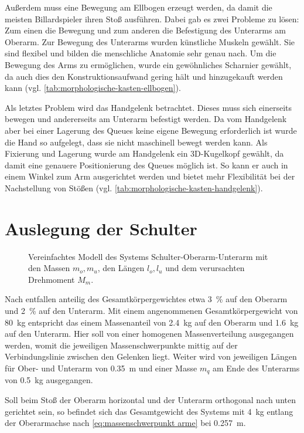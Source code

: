 		Außerdem muss eine Bewegung am Ellbogen erzeugt werden, da damit die meisten Billardspieler ihren Stoß ausführen. Dabei gab es zwei Probleme zu lösen: Zum einen die Bewegung und zum anderen die Befestigung des Unterarms am Oberarm. Zur Bewegung des Unterarms wurden künstliche Muskeln gewählt. Sie sind flexibel und bilden die menschliche Anatomie sehr genau nach. Um die Bewegung des Arms zu ermöglichen, wurde ein gewöhnliches Scharnier gewählt, da auch dies den Konstruktionsaufwand gering hält und hinzugekauft werden kann (vgl. \cref{tab:morphologische-kasten-ellbogen}).\par\medskip

		Als letztes Problem wird das Handgelenk betrachtet. Dieses muss sich einerseits bewegen und andererseits am Unterarm befestigt werden. Da vom Handgelenk aber bei einer Lagerung des Queues keine eigene Bewegung erforderlich ist wurde die Hand so aufgelegt, dass sie nicht maschinell bewegt werden kann. Als Fixierung und Lagerung wurde am Handgelenk ein 3D-Kugelkopf gewählt, da damit eine genauere Positionierung des Queues möglich ist. So kann er auch in einem Winkel zum Arm ausgerichtet werden und bietet mehr Flexibilität bei der Nachstellung von Stößen (vgl. \cref{tab:morphologische-kasten-handgelenk}).
	\section{Auslegung der Schulter}\label{sec:auslegung}

		\begin{figure}[h]
			\centering
			
			\caption[Vereinfachtes Modell des Systems Schulter-Oberarm-Unterarm]{Vereinfachtes Modell des Systems Schulter-Oberarm-Unterarm mit den Massen \(m_o, m_u\), den Längen \(l_o, l_u\) und dem verursachten Drehmoment \(M_m\).}%
			\label{fig:modell schulter oberarm unterarm}
		\end{figure}
		
		Nach \cite{Soll.1982} entfallen anteilig des Gesamtkörpergewichtes etwa \SI{3}{\percent} auf den Oberarm und \SI{2}{\percent} auf den Unterarm.
		Mit einem angenommenen Gesamtkörpergewicht von \SI{80}{\kilo\gram} entspricht das einem Massenanteil von \SI{2,4}{\kilo\gram} auf den Oberarm und \SI{1,6}{\kilo\gram} auf den Unterarm.
		Hier soll von einer homogenen Massenverteilung ausgegangen werden, womit die jeweiligen Massenschwerpunkte mittig auf der Verbindungslinie zwischen den Gelenken liegt.
		Weiter wird von jeweiligen Längen für Ober- und Unterarm von \SI{0,35}{\metre} und einer Masse \(m_q\) am Ende des Unterarms von \SI{0,5}{\kilo\gram} ausgegangen.\par
		Soll beim Stoß der Oberarm horizontal und der Unterarm orthogonal nach unten gerichtet sein, so befindet sich das Gesamtgewicht des Systems mit \SI{4}{\kilo\gram} entlang der Oberarmachse nach \cref{eq:massenschwerpunkt arme} bei \SI{0,257}{\metre}.

